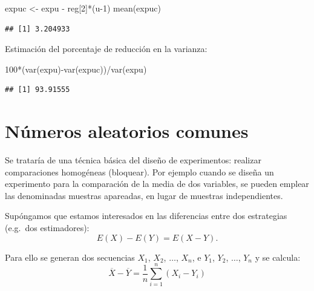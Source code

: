 \documentclass[
]{book}
\newenvironment{Shaded}{\begin{snugshade}}{\end{snugshade}}
\newcommand{\DecValTok}[1]{\textcolor[rgb]{0.00,0.00,0.81}{#1}}
\newcommand{\FunctionTok}[1]{\textcolor[rgb]{0.00,0.00,0.00}{#1}}
\newcommand{\NormalTok}[1]{#1}
\newcommand{\OtherTok}[1]{\textcolor[rgb]{0.56,0.35,0.01}{#1}}
\newcommand{\SpecialCharTok}[1]{\textcolor[rgb]{0.00,0.00,0.00}{#1}}
\theoremstyle{break}
\theoremstyle{definition}
\theoremstyle{definition}
\theoremstyle{definition}
\theoremstyle{definition}
\theoremstyle{remark}
\begin{document}
\begin{Shaded}
\begin{Highlighting}[]
\NormalTok{expuc }\OtherTok{\textless{}{-}}\NormalTok{ expu }\SpecialCharTok{{-}}\NormalTok{ reg[}\DecValTok{2}\NormalTok{]}\SpecialCharTok{*}\NormalTok{(u}\DecValTok{{-}1}\NormalTok{)}
\FunctionTok{mean}\NormalTok{(expuc)  }
\end{Highlighting}
\end{Shaded}

\begin{verbatim}
## [1] 3.204933
\end{verbatim}

Estimación del porcentaje de reducción en la varianza:

\begin{Shaded}
\begin{Highlighting}[]
\DecValTok{100}\SpecialCharTok{*}\NormalTok{(}\FunctionTok{var}\NormalTok{(expu)}\SpecialCharTok{{-}}\FunctionTok{var}\NormalTok{(expuc))}\SpecialCharTok{/}\FunctionTok{var}\NormalTok{(expu)}
\end{Highlighting}
\end{Shaded}

\begin{verbatim}
## [1] 93.91555
\end{verbatim}

\hypertarget{nuxfameros-aleatorios-comunes}{%
\section{Números aleatorios comunes}\label{nuxfameros-aleatorios-comunes}}

Se trataría de una técnica básica del diseño de experimentos:
realizar comparaciones homogéneas (bloquear).
Por ejemplo cuando se diseña un experimento para la comparación
de la media de dos variables, se pueden emplear las denominadas
muestras apareadas, en lugar de muestras independientes.

Supóngamos que estamos interesados en las diferencias entre dos
estrategias (e.g.~dos estimadores):
\[E\left(  X\right)  -E\left(  Y\right)  =E\left(  X-Y\right).\]

Para ello se generan dos secuencias \(X_{1}\), \(X_{2}\), \(\ldots\),
\(X_{n}\), e \(Y_{1}\), \(Y_{2}\), \(\ldots\), \(Y_{n}\) y se calcula:
\[\overline{X}-\overline{Y}=\frac{1}{n}\sum_{i=1}^{n}\left(  X_{i}-Y_{i}\right)\]
\end{document}
